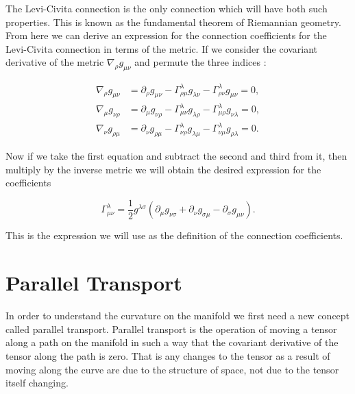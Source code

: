 The Levi-Civita connection is the only connection which will have both such properties. This is known as the fundamental theorem of Riemannian geometry. From here we can derive an expression for the connection coefficients for the Levi-Civita connection in terms of the metric. If we consider the covariant derivative of the metric \(\nabla_{\rho} g_{\mu \nu}\) and permute the three indices \cite{carroll, cheng}:

\begin{equation} \label{metric-deriv}
	\begin{aligned}
		\nabla_{\rho} g_{\mu \nu} &= \partial_{\rho} g_{\mu \nu} - \Gamma^{\lambda}_{\rho \mu} g_{\lambda \nu} - \Gamma^{\lambda}_{\rho \nu} g_{\mu \nu} = 0 ,\\
		\nabla_{\mu} g_{\nu \rho} &= \partial_{\mu} g_{\nu \rho} - \Gamma^{\lambda}_{\mu \nu} g_{\lambda \rho} - \Gamma^{\lambda}_{\mu \rho} g_{\nu \lambda} = 0 ,\\
		\nabla_{\nu} g_{\rho \mu} &= \partial_{\nu} g_{\rho \mu} - \Gamma^{\lambda}_{\nu \rho} g_{\lambda \mu} - \Gamma^{\lambda}_{\nu \mu} g_{\rho \lambda} = 0 .
	\end{aligned}
\end{equation}

Now if we take the first equation and subtract the second and third from it, then multiply by the inverse metric we will obtain the desired expression for the coefficients \cite{carroll}

\begin{equation} \label{christ-def}
	\Gamma^{\lambda}_{\mu \nu} = \frac{1}{2} g^{\lambda \sigma} \left( \partial_{\mu} g_{\nu \sigma} + \partial_{\nu} g_{\sigma \mu} - \partial_{\sigma} g_{\mu \nu} \right) .
\end{equation}

This is the expression we will use as the definition of the connection coefficients.

\section{Parallel Transport}

In order to understand the curvature on the manifold we first need a new concept called parallel transport. Parallel transport is the operation of moving a tensor along a path on the manifold in such a way that the covariant derivative of the tensor along the path is zero. That is any changes to the tensor as a result of moving along the curve are due to the structure of space, not due to the tensor itself changing.

